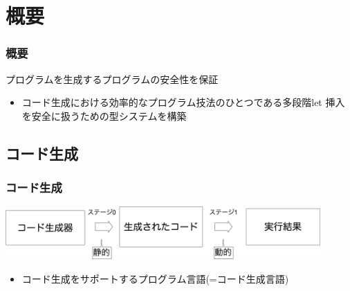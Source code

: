 
\section{概要}

\begin{frame}
  \frametitle{概要}
  プログラムを生成するプログラムの安全性を保証
  \begin{itemize}
  \item<1-> [⇒] コード生成における効率的なプログラム技法のひとつである\alert{多段階let 挿入}を安全に扱うための型システムを構築
  \end{itemize}
\end{frame}

\subsection{コード生成}
\begin{frame}
  \frametitle{コード生成}
  \medskip
  \flushleft
  \includegraphics[clip,height=2cm]{./img/prggen.png}

  \begin{itemize}
  \item コード生成をサポートするプログラム言語(=\alert{コード生成言語})
  \end{itemize}
\end{frame}

